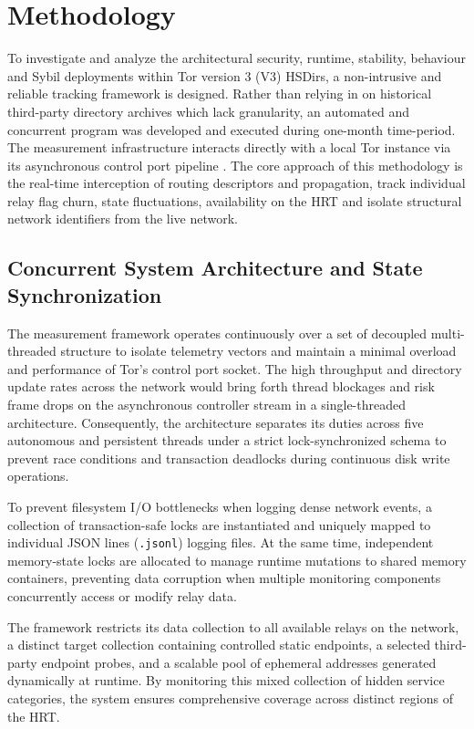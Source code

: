 \documentclass[conference]{IEEEtran}
\begin{document}
\section{Methodology}

To investigate and analyze the architectural security, runtime, stability, behaviour and Sybil deployments within Tor version 3 (V3) HSDirs, a non-intrusive and reliable tracking framework is designed. Rather than relying in on historical third-party directory archives which lack granularity, an automated and concurrent 
program was developed and executed during one-month time-period. The measurement infrastructure interacts directly with a local Tor instance via its asynchronous control port pipeline \cite{tor_controlspec}. The core approach of this methodology is the real-time interception of routing descriptors and propagation, track individual relay flag 
churn, state fluctuations, availability on the HRT and isolate structural network identifiers from the live network.

\subsection{Concurrent System Architecture and State Synchronization}

The measurement framework operates continuously over a set of decoupled multi-threaded structure to isolate telemetry vectors and maintain a minimal overload and performance of Tor's control port socket. The high throughput and directory update rates across the network would bring forth thread blockages and risk frame 
drops on the asynchronous controller stream in a single-threaded architecture. Consequently, the architecture separates its duties across five autonomous and persistent threads under a strict lock-synchronized schema to prevent race conditions and transaction deadlocks during continuous disk write operations.

To prevent filesystem I/O bottlenecks when logging dense network events, a collection of transaction-safe locks are instantiated and uniquely mapped to individual JSON lines (\texttt{.jsonl}) logging files. At the same time, independent memory-state locks are allocated to manage runtime mutations to shared memory containers,
preventing data corruption when multiple monitoring components concurrently access or modify relay data.

The framework restricts its data collection to all available relays on the network, a distinct target collection containing controlled static endpoints, a selected third-party endpoint probes, and a scalable pool of ephemeral addresses generated dynamically at runtime. By monitoring this mixed collection of hidden service 
categories, the system ensures comprehensive coverage across distinct regions of the HRT.
\end{document}
